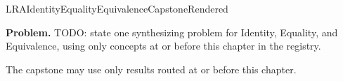 \ifcsname LRAIdentityEqualityEquivalenceCapstoneRendered\endcsname
\else
\expandafter\gdef\csname LRAIdentityEqualityEquivalenceCapstoneRendered\endcsname{}

\newpage
{}
\label{cap:identity-equality-equivalence}

\begin{tcolorbox}[
  colback=gray!6,
  colframe=gray!40,
  arc=2pt,
  left=8pt, right=8pt, top=6pt, bottom=6pt,
  title={\small\textbf{Capstone Problem}},
  fonttitle=\small\bfseries
]
\textbf{Problem.}
TODO: state one synthesizing problem for Identity, Equality, and Equivalence,
using only concepts at or before this chapter in the registry.
\end{tcolorbox}

\begin{remark*}
The capstone may use only results routed at or before this chapter.
\end{remark*}

\clearpage
\fi
